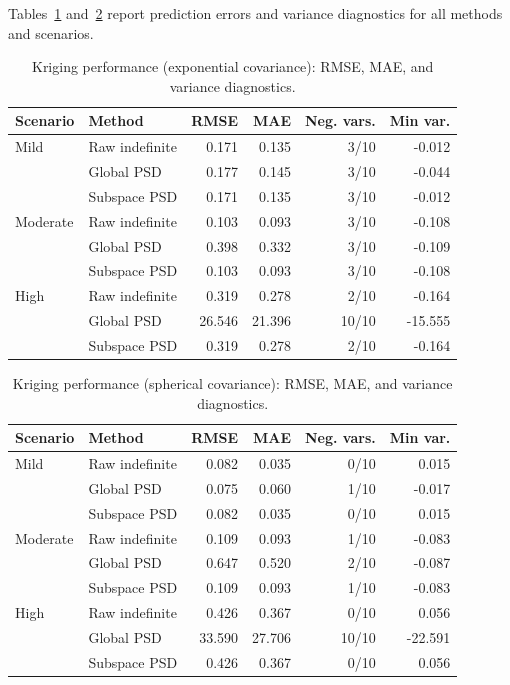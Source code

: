 \documentclass[smallextended]{svjour3}
\newcommand{\1}{\mathbf{1}}
\begin{document}
Tables~\ref{tab:exp_performance} and~\ref{tab:sph_performance} report prediction errors and variance diagnostics for all methods and scenarios. 

\begin{table}[htbp]
	\centering
	\caption{Kriging performance (exponential covariance): RMSE, MAE, and variance diagnostics.}
	\label{tab:exp_performance}
	\begin{tabular}{llrrrr}
		\hline
		Scenario & Method & RMSE & MAE & Neg. vars. & Min var. \\
		\hline
		Mild     & Raw indefinite   & 0.171 & 0.135 & 3/10 & -0.012 \\
		& Global PSD       & 0.177 & 0.145 & 3/10 & -0.044 \\
		& Subspace PSD     & 0.171 & 0.135 & 3/10 & -0.012 \\
		\hline
		Moderate & Raw indefinite   & 0.103 & 0.093 & 3/10 & -0.108 \\
		& Global PSD       & 0.398 & 0.332 & 3/10 & -0.109 \\
		& Subspace PSD     & 0.103 & 0.093 & 3/10 & -0.108 \\
		\hline
		High     & Raw indefinite   & 0.319 & 0.278 & 2/10 & -0.164 \\
		& Global PSD       & 26.546 & 21.396 & 10/10 & -15.555 \\
		& Subspace PSD     & 0.319 & 0.278 & 2/10 & -0.164 \\
		\hline
	\end{tabular}
\end{table}

\begin{table}[htbp]
	\centering
	\caption{Kriging performance (spherical covariance): RMSE, MAE, and variance diagnostics.}
	\label{tab:sph_performance}
	\begin{tabular}{llrrrr}
		\hline
		Scenario & Method & RMSE & MAE & Neg. vars. & Min var. \\
		\hline
		Mild     & Raw indefinite   & 0.082 & 0.035 & 0/10 & 0.015 \\
		& Global PSD       & 0.075 & 0.060 & 1/10 & -0.017 \\
		& Subspace PSD     & 0.082 & 0.035 & 0/10 & 0.015 \\
		\hline
		Moderate & Raw indefinite   & 0.109 & 0.093 & 1/10 & -0.083 \\
		& Global PSD       & 0.647 & 0.520 & 2/10 & -0.087 \\
		& Subspace PSD     & 0.109 & 0.093 & 1/10 & -0.083 \\
		\hline
		High     & Raw indefinite   & 0.426 & 0.367 & 0/10 & 0.056 \\
		& Global PSD       & 33.590 & 27.706 & 10/10 & -22.591 \\
		& Subspace PSD     & 0.426 & 0.367 & 0/10 & 0.056 \\
		\hline
	\end{tabular}
\end{table}
\end{document}
